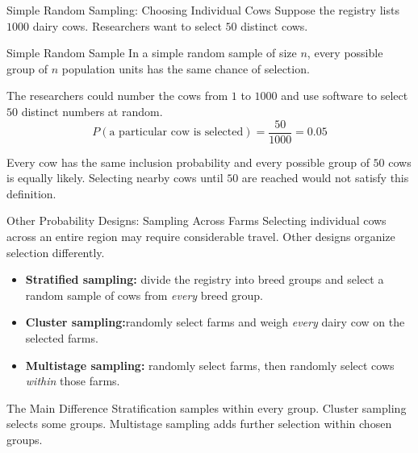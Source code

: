 \documentclass[aspectratio=169]{beamer}
\begin{document}
\begin{frame}{Simple Random Sampling: Choosing Individual Cows}
Suppose the registry lists $1000$ dairy cows. Researchers want to select $50$ distinct cows.

\begin{block}{Simple Random Sample}
In a simple random sample of size $n$, every possible group of $n$ population units has the same chance of selection.
\end{block}

The researchers could number the cows from $1$ to $1000$ and use software to select $50$ distinct numbers at random.
$$P(\text{a particular cow is selected})=\frac{50}{1000}=0.05$$

\small
Every cow has the same inclusion probability and every possible group of $50$ cows is equally likely. Selecting nearby cows until $50$ are reached would not satisfy this definition.
\end{frame}

\begin{frame}{Other Probability Designs: Sampling Across Farms}
Selecting individual cows across an entire region may require considerable travel. Other designs organize selection differently.

\begin{itemize}
	\item \textbf{Stratified sampling:} divide the registry into breed groups and select a random sample of cows from \emph{every} breed group.
	\item \textbf{Cluster sampling:}randomly select farms and weigh \emph{every} dairy cow on the selected farms.
	\item \textbf{Multistage sampling:} randomly select farms, then randomly select cows \emph{within} those farms.
\end{itemize}

\begin{block}{The Main Difference}
Stratification samples within every group. Cluster sampling selects some groups. Multistage sampling adds further selection within chosen groups.
\end{block}
\end{frame}
\end{document}
